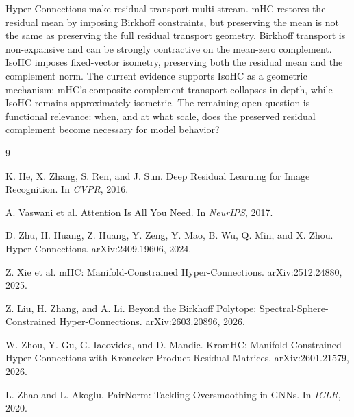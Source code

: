 \documentclass[10pt]{article}
\begin{document}
Hyper-Connections make residual transport multi-stream.  mHC restores the
residual mean by imposing Birkhoff constraints, but preserving the mean is not
the same as preserving the full residual transport geometry.  Birkhoff transport
is non-expansive and can be strongly contractive on the mean-zero complement.
IsoHC imposes fixed-vector isometry, preserving both the residual mean and the
complement norm.  The current evidence supports IsoHC as a geometric mechanism:
mHC's composite complement transport collapses in depth, while IsoHC remains
approximately isometric.  The remaining open question is functional relevance:
when, and at what scale, does the preserved residual complement become necessary
for model behavior?

\begin{thebibliography}{9}

K. He, X. Zhang, S. Ren, and J. Sun.
\newblock Deep Residual Learning for Image Recognition.
\newblock In \emph{CVPR}, 2016.

A. Vaswani et al.
\newblock Attention Is All You Need.
\newblock In \emph{NeurIPS}, 2017.

D. Zhu, H. Huang, Z. Huang, Y. Zeng, Y. Mao, B. Wu, Q. Min, and X. Zhou.
\newblock Hyper-Connections.
\newblock arXiv:2409.19606, 2024.

Z. Xie et al.
\newblock mHC: Manifold-Constrained Hyper-Connections.
\newblock arXiv:2512.24880, 2025.

Z. Liu, H. Zhang, and A. Li.
\newblock Beyond the Birkhoff Polytope: Spectral-Sphere-Constrained Hyper-Connections.
\newblock arXiv:2603.20896, 2026.

W. Zhou, Y. Gu, G. Iacovides, and D. Mandic.
\newblock KromHC: Manifold-Constrained Hyper-Connections with Kronecker-Product Residual Matrices.
\newblock arXiv:2601.21579, 2026.

L. Zhao and L. Akoglu.
\newblock PairNorm: Tackling Oversmoothing in GNNs.
\newblock In \emph{ICLR}, 2020.

\end{thebibliography}
\end{document}
